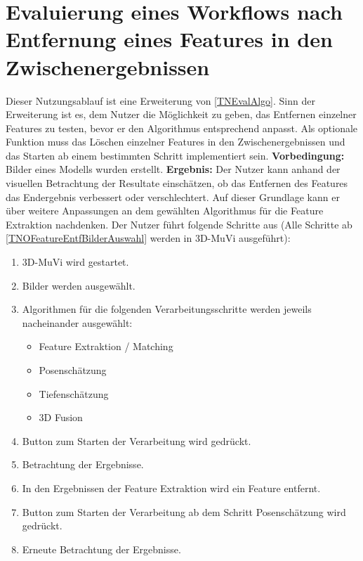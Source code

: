 \section{Evaluierung eines Workflows nach Entfernung eines Features in den Zwischenergebnissen}
Dieser Nutzungsablauf ist eine Erweiterung von \ref{TNEvalAlgo}. Sinn der Erweiterung ist es, dem Nutzer die Möglichkeit zu geben, das Entfernen einzelner Features zu testen, bevor er den Algorithmus entsprechend anpasst. Als optionale Funktion muss das Löschen einzelner Features in den Zwischenergebnissen und das Starten ab einem bestimmten Schritt implementiert sein. \newline
\textbf{Vorbedingung:} Bilder eines Modells wurden erstellt. \newline
\textbf{Ergebnis:} Der Nutzer kann anhand der visuellen Betrachtung der Resultate einschätzen, ob das Entfernen des Features das Endergebnis verbessert oder verschlechtert. Auf dieser Grundlage kann er über weitere Anpassungen an dem gewählten Algorithmus für die Feature Extraktion nachdenken. \newline
Der Nutzer führt folgende Schritte aus (Alle Schritte ab \ref{TNOFeatureEntfBilderAuswahl} werden in 3D-MuVi ausgeführt):
\begin{enumerate}
	\item 3D-MuVi wird gestartet.
	\item \label{TNOFeatureEntfBilderAuswahl} Bilder werden ausgewählt.
	\item Algorithmen für die folgenden Verarbeitungsschritte werden jeweils nacheinander ausgewählt:
	\begin{itemize}
		\item Feature Extraktion / Matching
		\item Posenschätzung
		\item Tiefenschätzung
		\item 3D Fusion
	\end{itemize}
	\item Button zum Starten der Verarbeitung wird gedrückt.
	\item Betrachtung der Ergebnisse.
	\item In den Ergebnissen der Feature Extraktion wird ein Feature entfernt.
	\item Button zum Starten der Verarbeitung ab dem Schritt Posenschätzung wird gedrückt.
	\item Erneute Betrachtung der Ergebnisse.
\end{enumerate}
